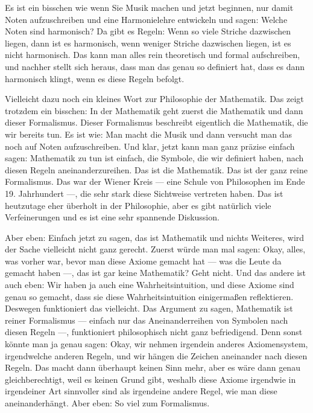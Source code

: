 \begin{spoken-clean}[00:11:15 - 00:13:30]
Es ist ein bisschen wie wenn Sie Musik machen und jetzt beginnen, nur damit Noten aufzuschreiben und eine Harmonielehre entwickeln und sagen: Welche Noten sind harmonisch? Da gibt es Regeln: Wenn so viele Striche dazwischen liegen, dann ist es harmonisch, wenn weniger Striche dazwischen liegen, ist es nicht harmonisch. Das kann man alles rein theoretisch und formal aufschreiben, und nachher stellt sich heraus, dass man das genau so definiert hat, dass es dann harmonisch klingt, wenn es diese Regeln befolgt.

Vielleicht dazu noch ein kleines Wort zur Philosophie der Mathematik. Das zeigt trotzdem ein bisschen: In der Mathematik geht zuerst die Mathematik und dann dieser Formalismus. Dieser Formalismus beschreibt eigentlich die Mathematik, die wir bereits tun. Es ist wie: Man macht die Musik und dann versucht man das noch auf Noten aufzuschreiben. Und klar, jetzt kann man ganz präzise einfach sagen: Mathematik zu tun ist einfach, die Symbole, die wir definiert haben, nach diesen Regeln aneinanderzureihen. Das ist die Mathematik. Das ist der ganz reine Formalismus. Das war der Wiener Kreis --- eine Schule von Philosophen im Ende 19. Jahrhundert ---, die sehr stark diese Sichtweise vertreten haben. Das ist heutzutage eher überholt in der Philosophie, aber es gibt natürlich viele Verfeinerungen und es ist eine sehr spannende Diskussion.

Aber eben: Einfach jetzt zu sagen, das ist Mathematik und nichts Weiteres, wird der Sache vielleicht nicht ganz gerecht. Zuerst würde man mal sagen: Okay, alles, was vorher war, bevor man diese Axiome gemacht hat --- was die Leute da gemacht haben ---, das ist gar keine Mathematik? Geht nicht. Und das andere ist auch eben: Wir haben ja auch eine Wahrheitsintuition, und diese Axiome sind genau so gemacht, dass sie diese Wahrheitsintuition einigermaßen reflektieren. Deswegen funktioniert das vielleicht. Das Argument zu sagen, Mathematik ist reiner Formalismus --- einfach nur das Aneinanderreihen von Symbolen nach diesen Regeln ---, funktioniert philosophisch nicht ganz befriedigend. Denn sonst könnte man ja genau sagen: Okay, wir nehmen irgendein anderes Axiomensystem, irgendwelche anderen Regeln, und wir hängen die Zeichen aneinander nach diesen Regeln. Das macht dann überhaupt keinen Sinn mehr, aber es wäre dann genau gleichberechtigt, weil es keinen Grund gibt, weshalb diese Axiome irgendwie in irgendeiner Art sinnvoller sind als irgendeine andere Regel, wie man diese aneinanderhängt. Aber eben: So viel zum Formalismus.


\end{spoken-clean}
